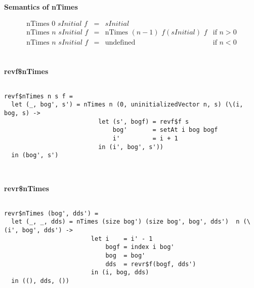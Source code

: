 \documentclass[sigplan,review]{acmart}
\newcommand{\lb}{\llbracket}
\newcommand{\rb}{\rrbracket}
\begin{document}
\begin{figure*}
  \begin{minipage}{\textwidth}
      {\bf Semantics of nTimes}

      \newcommand{\gradS}[2]{\nabla_{#1}\lb #2 \rb}
      \newcommand{\gradV}[1]{\nabla#1}

\[
      \begin{array}{rcll}
        \mathrm{nTimes} \,\, 0 \,\, sInitial \,\, f & = & sInitial \\
        \mathrm{nTimes} \,\, n \,\, sInitial \,\, f & = &
        \mathrm{nTimes} \,\, (n-1) \,\, f(sInitial) \,\, f & \textrm{if
          $n > 0$}\\
        \mathrm{nTimes} \,\, n \,\, sInitial \,\, f & = &
        \mathrm{undefined} & \textrm{if $n < 0$}\\
      \end{array}
      \]
\\
\begin{minipage}{\textwidth}
      {\bf revf\$nTimes}
\begin{verbatim}

revf$nTimes n s f =
  let (_, bog', s') = nTimes n (0, uninitializedVector n, s) (\(i, bog, s) ->
                          let (s', bogf) = revf$f s
                              bog'       = setAt i bog bogf
                              i'         = i + 1
                          in (i', bog', s'))
  in (bog', s')

\end{verbatim}
\end{minipage}
\\
\begin{minipage}{\textwidth}
      {\bf revr\$nTimes}
\begin{verbatim}

revr$nTimes (bog', dds') =
  let (_, _, dds) = nTimes (size bog') (size bog', bog', dds')  n (\(i', bog', dds') ->
                        let i    = i' - 1
                            bogf = index i bog'
                            bog  = bog'
                            dds  = revr$f(bogf, dds')
                        in (i, bog, dds)
  in ((), dds, ())

\end{verbatim}
\end{minipage}
\end{minipage}
\caption{Behaviour of nTimes}
\end{figure*}
\end{document}
